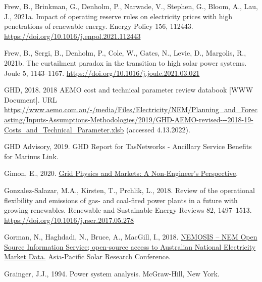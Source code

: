 \documentclass[12pt,a4paper,]{report}
\newlength{\cslhangindent}
\newenvironment{CSLReferences}[2] %
 {%
  \setlength{\parindent}{0pt}
  \ifodd #1 \everypar{\setlength{\hangindent}{\cslhangindent}}\ignorespaces\fi
  \ifnum #2 > 0
  \setlength{\parskip}{#2\baselineskip}
  \fi
 }%
 {}
\begin{document}
\begin{CSLReferences}{1}{0}
\leavevmode{}%
Frew, B., Brinkman, G., Denholm, P., Narwade, V., Stephen, G., Bloom,
A., Lau, J., 2021a. Impact of operating reserve rules on electricity
prices with high penetrations of renewable energy. Energy Policy 156,
112443. \url{https://doi.org/10.1016/j.enpol.2021.112443}

\leavevmode{}%
Frew, B., Sergi, B., Denholm, P., Cole, W., Gates, N., Levie, D.,
Margolis, R., 2021b. The curtailment paradox in the transition to high
solar power systems. Joule 5, 1143--1167.
\url{https://doi.org/10.1016/j.joule.2021.03.021}

\leavevmode{}%
GHD, 2018. 2018 {AEMO} cost and technical parameter review databook
{[}WWW Document{]}. URL
\url{https://www.aemo.com.au/-/media/Files/Electricity/NEM/Planning_and_Forecasting/Inputs-Assumptions-Methodologies/2019/GHD-AEMO-revised---2018-19-Costs_and_Technical_Parameter.xlsb}
(accessed 4.13.2022).

\leavevmode{}%
GHD Advisory, 2019. {GHD Report} for {TasNetworks} - {Ancillary Service
Benefits} for {Marinus Link}.

\leavevmode{}%
Gimon, E., 2020.
\href{https://www.esig.energy/download/plenary-1-grid-physics-and-markets-a-non-engineers-perspective-eric-gimon/}{Grid
{Physics} and {Markets}: {A Non-Engineer}'s {Perspective}}.

\leavevmode{}%
Gonzalez-Salazar, M.A., Kirsten, T., Prchlik, L., 2018. Review of the
operational flexibility and emissions of gas- and coal-fired power
plants in a future with growing renewables. Renewable and Sustainable
Energy Reviews 82, 1497--1513.
\url{https://doi.org/10.1016/j.rser.2017.05.278}

\leavevmode{}%
Gorman, N., Haghdadi, N., Bruce, A., MacGill, I., 2018.
\href{https://www.researchgate.net/publication/329798805}{{NEMOSIS} --
{NEM Open Source Information Service}; open-source access to {Australian
National Electricity Market Data}.} Asia-Pacific Solar Research
Conference.

\leavevmode{}%
Grainger, J.J., 1994. Power system analysis. {McGraw-Hill}, {New York}.


\end{CSLReferences}
\end{document}
